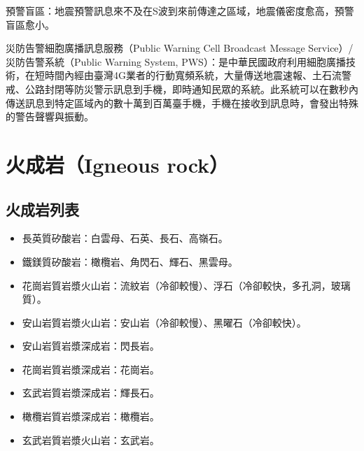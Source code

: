 \documentclass[a4paper,12pt]{report}
\begin{document}
預警盲區：地震預警訊息來不及在S波到來前傳達之區域，地震儀密度愈高，預警盲區愈小。

災防告警細胞廣播訊息服務（Public Warning Cell Broadcast Message Service）/災防告警系統（Public Warning System, PWS）：是中華民國政府利用細胞廣播技術，在短時間內經由臺灣4G業者的行動寬頻系統，大量傳送地震速報、土石流警戒、公路封閉等防災警示訊息到手機，即時通知民眾的系統。此系統可以在數秒內傳送訊息到特定區域內的數十萬到百萬臺手機，手機在接收到訊息時，會發出特殊的警告聲響與振動。
\section{火成岩（Igneous rock）}
\subsection{火成岩列表}
\begin{itemize}
\item 長英質矽酸岩：白雲母、石英、長石、高嶺石。
\item 鐵鎂質矽酸岩：橄欖岩、角閃石、輝石、黑雲母。
\item 花崗岩質岩漿火山岩：流紋岩（冷卻較慢）、浮石（冷卻較快，多孔洞，玻璃質）。
\item 安山岩質岩漿火山岩：安山岩（冷卻較慢）、黑曜石（冷卻較快）。
\item 安山岩質岩漿深成岩：閃長岩。
\item 花崗岩質岩漿深成岩：花崗岩。
\item 玄武岩質岩漿深成岩：輝長石。
\item 橄欖岩質岩漿深成岩：橄欖岩。
\item 玄武岩質岩漿火山岩：玄武岩。
\end{itemize}
\end{document}
